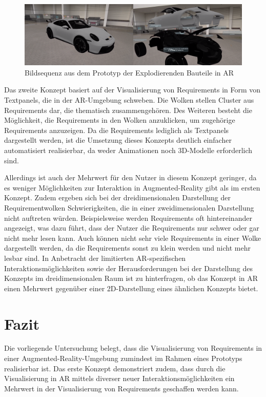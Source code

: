 \begin{figure}[H]
    \centering
    \includegraphics[width=1\textwidth]{images/PorscheExplosionAR.png}
    \caption{Bildsequenz aus dem Prototyp der Explodierenden Bauteile in AR}
    \label{fig:porsche-explosion-ar}
\end{figure}
 
Das zweite Konzept basiert auf der Visualisierung von Requirements in Form von Textpanels, die in der AR-Umgebung schweben.
Die Wolken stellen Cluster aus Requirements dar, die thematisch zusammengehören.
Des Weiteren besteht die Möglichkeit, die Requirements in den Wolken anzuklicken, um zugehörige Requirements anzuzeigen.
Da die Requirements lediglich als Textpanels dargestellt werden, ist die Umsetzung dieses Konzepts deutlich einfacher automatisiert realisierbar, da weder Animationen noch 3D-Modelle erforderlich sind.

Allerdings ist auch der Mehrwert für den Nutzer in diesem Konzept geringer, da es weniger Möglichkeiten zur Interaktion in Augmented-Reality gibt als im ersten Konzept.
Zudem ergeben sich bei der dreidimensionalen Darstellung der Requirementwolken Schwierigkeiten, die in einer zweidimensionalen Darstellung nicht auftreten würden.
Beispielsweise werden Requirements oft hintereinander angezeigt, was dazu führt, dass der Nutzer die Requirements nur schwer oder gar nicht mehr lesen kann.
Auch können nicht sehr viele Requirements in einer Wolke dargestellt werden, da die Requirements sonst zu klein werden und nicht mehr lesbar sind.
In Anbetracht der limitierten AR-spezifischen Interaktionsmöglichkeiten sowie der Herausforderungen bei der Darstellung des Konzepts im dreidimensionalen Raum ist zu hinterfragen, ob das Konzept in AR einen Mehrwert gegenüber einer 2D-Darstellung eines ähnlichen Konzepts bietet.


\newpage

\section{Fazit}

Die vorliegende Untersuchung belegt, dass die Visualisierung von Requirements in einer Augmented-Reality-Umgebung zumindest im Rahmen eines Prototyps realisierbar ist.
Das erste Konzept demonstriert zudem, dass durch die Visualisierung in AR mittels diverser neuer Interaktionsmöglichkeiten ein Mehrwert in der Visualisierung von Requirements geschaffen werden kann.


